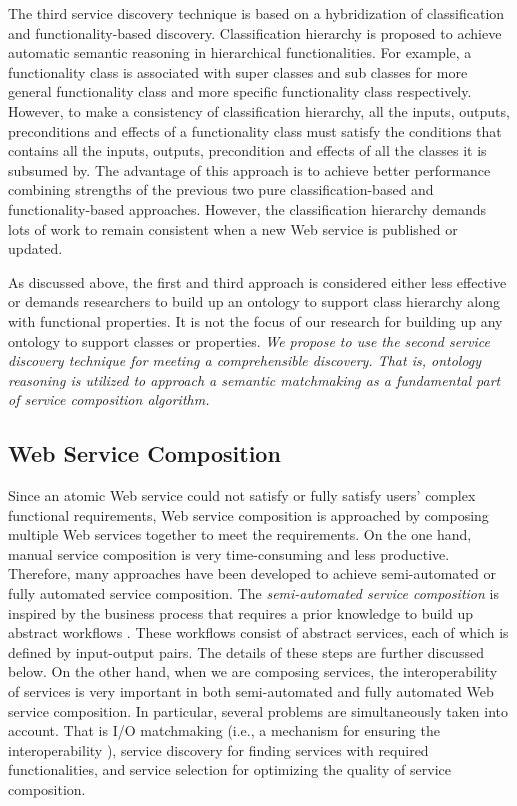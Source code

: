 The third service discovery technique is based on a hybridization of classification and functionality-based discovery. Classification hierarchy is proposed to achieve automatic semantic reasoning in hierarchical functionalities. For example, a functionality class is associated with super classes and sub classes for more general functionality class and more specific functionality class respectively. However, to make a consistency of classification hierarchy, all the inputs, outputs, preconditions and effects of a functionality class must satisfy the conditions that contains all the inputs, outputs, precondition and effects of all the classes it is subsumed by. The advantage of this approach is to achieve better performance combining strengths of the previous two pure classification-based and functionality-based approaches. However, the classification hierarchy demands lots of work to remain consistent when a new Web service is published or updated.​

As discussed above, the first and third approach is considered either less effective or demands researchers to build up an ontology to support class hierarchy along with functional properties. It is not the focus of our research for building up any ontology to support classes or properties.  \emph{We propose to use the second service discovery technique for meeting a comprehensible discovery. That is, ontology reasoning is utilized to approach a semantic matchmaking as a fundamental part of service composition algorithm.}



\subsection{Web Service Composition}\label{servicecomposition}

Since an atomic Web service could not satisfy or fully satisfy users' complex functional requirements, Web service composition is approached by composing multiple Web services together to meet the requirements. On the one hand, manual service composition is very time-consuming and less productive. Therefore, many approaches have been developed to achieve semi-automated or fully automated service composition. The \emph{semi-automated service composition} is inspired by the business process that requires a prior knowledge to build up abstract workflows \cite{moghaddam2014service}. These workflows consist of abstract services, each of which is defined by input-output pairs. The details of these steps are further discussed below. On the other hand, when we are composing services, the interoperability of services is very important in both semi-automated and fully automated Web service composition. In particular, several problems are simultaneously taken into account. That is I/O matchmaking (i.e., a mechanism for ensuring the interoperability ), service discovery for finding services with required functionalities, and service selection for optimizing the quality of service composition. 


